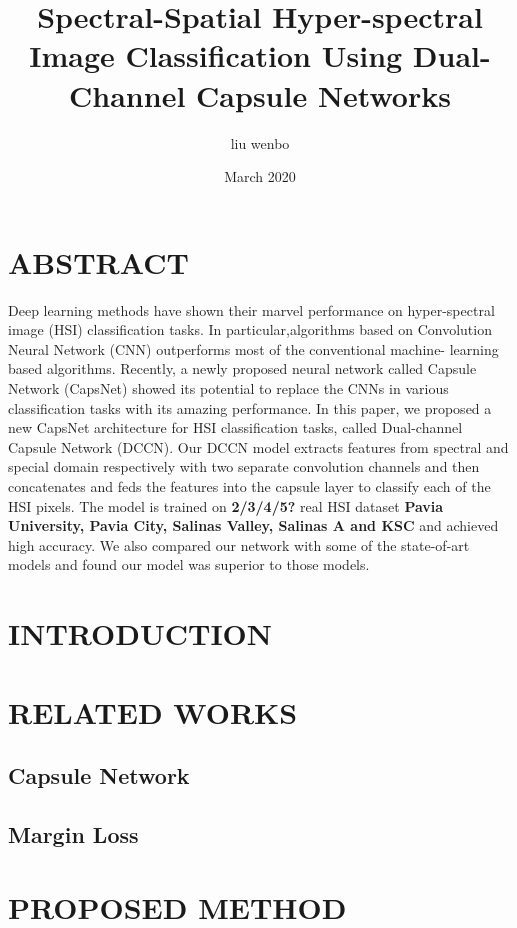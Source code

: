 \documentclass{article}
\title{Spectral-Spatial Hyper-spectral Image Classification Using Dual-Channel Capsule Networks}
\author{liu wenbo}
\date{March 2020}
\begin{document}
	\maketitle


	\section{ABSTRACT}\label{sec:abstract}
	Deep learning methods have shown their marvel performance on hyper-spectral image (HSI) classification tasks.
	In particular,algorithms based on Convolution Neural Network (CNN) outperforms most of the conventional machine-
	learning based algorithms.
	Recently, a newly proposed neural network called Capsule Network (CapsNet) showed its potential to replace the CNNs
	in various classification tasks with its amazing performance.
	In this paper, we proposed a new CapsNet architecture for HSI classification tasks, called Dual-channel Capsule
	Network (DCCN).
	Our DCCN model extracts features from spectral and special domain respectively with two separate convolution
	channels and then concatenates and feds the features into the capsule layer to classify each of the HSI pixels.
	The model is trained on \textbf{2/3/4/5?} real HSI dataset \textbf{Pavia University, Pavia City, Salinas Valley,
	Salinas A and KSC} and achieved high accuracy.
	We also compared our network with some of the state-of-art models and found our model was superior to those models.


	\section{INTRODUCTION}\label{sec:introduction}


	\section{RELATED WORKS}\label{sec:related-works}

	\subsection{Capsule Network}\label{subsec:capsule-network}

	\subsection{Margin Loss}\label{subsec:margin-loss}


	\section{PROPOSED METHOD}\label{sec:proposed-method}
\end{document}
